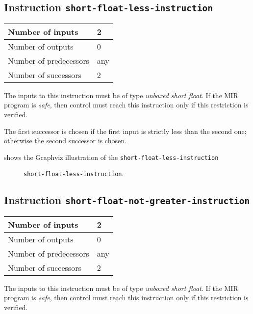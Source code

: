 \subsection{Instruction \texttt{short-float-less-instruction}}
\label{mir-instruction-short-float-less}

\begin{tabular}{|l|l|}
\hline
Number of inputs & 2\\
\hline
Number of outputs & 0\\
\hline
Number of predecessors & any\\
\hline
Number of successors & 2\\
\hline
\end{tabular}

The inputs to this instruction must be of type \emph{unboxed short
  float}.  If the MIR program is \emph{safe}, then control must reach
this instruction only if this restriction is verified.

The first successor is chosen if the first input is strictly less than
the second one; otherwise the second successor is chosen. 

 shows the Graphviz illustration of the
\texttt{short-float-less-instruction}

\begin{figure}
\begin{center}
\end{center}
\caption{\label{fig-short-float-less-instruction}
\texttt{short-float-less-instruction}.}
\end{figure}

\subsection{Instruction \texttt{short-float-not-greater-instruction}}
\label{mir-instruction-short-float-not-greater}

\begin{tabular}{|l|l|}
\hline
Number of inputs & 2\\
\hline
Number of outputs & 0\\
\hline
Number of predecessors & any\\
\hline
Number of successors & 2\\
\hline
\end{tabular}

The inputs to this instruction must be of type \emph{unboxed short
  float}.  If the MIR program is \emph{safe}, then control must reach
this instruction only if this restriction is verified.

